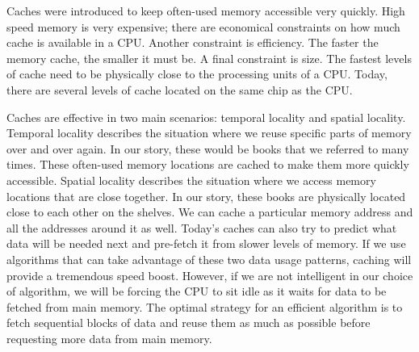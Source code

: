 Caches were introduced to keep often-used memory accessible very quickly.  High speed memory is very expensive; there are economical constraints on how much cache is available in a CPU.
Another constraint is efficiency.  The faster the memory cache, the smaller it must be.
A final constraint is size.  The fastest levels of cache need to be physically close to the processing units of a CPU.
Today, there are several levels of cache located on the same chip as the CPU.

Caches are effective in two main scenarios: temporal locality and spatial locality.
Temporal locality describes the situation where we reuse specific parts of memory over and over again.
In our story, these would be books that we referred to many times.
These often-used memory locations are cached to make them more quickly accessible.
Spatial locality describes the situation where we access memory locations that are close together.
In our story, these books are physically located close to each other on the shelves.
We can cache a particular memory address and all the addresses around it as well.
Today's caches can also try to predict what data will be needed next and pre-fetch it from slower levels of memory.
If we use algorithms that can take advantage of these two data usage patterns, caching will provide a tremendous speed boost.
However, if we are not intelligent in our choice of algorithm, we will be forcing the CPU to sit idle as it waits for data to be fetched from main memory.
The optimal strategy for an efficient algorithm is to fetch sequential blocks of data and reuse them as much as possible before requesting more data from main memory.

